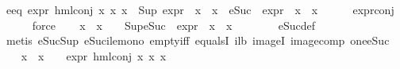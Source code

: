 \begin{isabellebody}
\ e{}{\isacharunderscore}{\kern0pt}eq{\isacharcolon}{\kern0pt}\ {\isachardoublequoteopen}expr{\isacharunderscore}{\kern0pt}{}\ {\isacharparenleft}{\kern0pt}hml{\isacharunderscore}{\kern0pt}conj\ x{}\ x{}\ x{}{\isacharparenright}{\kern0pt}\ {\isacharequal}{\kern0pt}\ {\isacharparenleft}{\kern0pt}Sup\ {\isacharparenleft}{\kern0pt}{\isacharparenleft}{\kern0pt}expr{\isacharunderscore}{\kern0pt}{}\ {\isasymcirc}\ x{}{\isacharparenright}{\kern0pt}\ {\isacharbackquote}{\kern0pt}\ x{}\ {\isasymunion}\ {\isacharparenleft}{\kern0pt}{\isacharparenleft}{\kern0pt}eSuc\ {\isasymcirc}\ expr{\isacharunderscore}{\kern0pt}{}\ {\isasymcirc}\ x{}{\isacharparenright}{\kern0pt}\ {\isacharbackquote}{\kern0pt}\ x{}{\isacharparenright}{\kern0pt}{\isacharparenright}{\kern0pt}{\isacharparenright}{\kern0pt}{\isachardoublequoteclose}\isanewline
\ \ \ \ \isamarkupfalse%
\ expr{\isacharunderscore}{\kern0pt}{}{\isacharunderscore}{\kern0pt}conj\isanewline
\ \ \ \ \isamarkupfalse%
\ force\isanewline
\ \ \isamarkupfalse%
\ {\isachardoublequoteopen}{\isacharparenleft}{\kern0pt}x{}\ {\isacharbackquote}{\kern0pt}\ x{}\ {\isasymnoteq}\ {\isacharbraceleft}{\kern0pt}{\isacharbraceright}{\kern0pt}{\isacharparenright}{\kern0pt}\ {\isasymlongrightarrow}\ Sup{\isacharparenleft}{\kern0pt}{\isacharparenleft}{\kern0pt}{\isacharparenleft}{\kern0pt}eSuc\ {\isasymcirc}\ expr{\isacharunderscore}{\kern0pt}{}\ {\isasymcirc}\ x{}{\isacharparenright}{\kern0pt}\ {\isacharbackquote}{\kern0pt}\ x{}{\isacharparenright}{\kern0pt}{\isacharparenright}{\kern0pt}\ {\isasymge}\ {}{\isachardoublequoteclose}\isanewline
\ \ \ \ \isamarkupfalse%
\ eSuc{\isacharunderscore}{\kern0pt}def\ \isanewline
\ \ \ \ \isamarkupfalse%
\ {\isacharparenleft}{\kern0pt}metis\ eSuc{\isacharunderscore}{\kern0pt}Sup\ eSuc{\isacharunderscore}{\kern0pt}ile{\isacharunderscore}{\kern0pt}mono\ empty{\isacharunderscore}{\kern0pt}iff\ equals{}I\ i{}{\isacharunderscore}{\kern0pt}lb\ imageI\ image{\isacharunderscore}{\kern0pt}comp\ one{\isacharunderscore}{\kern0pt}eSuc{\isacharparenright}{\kern0pt}\isanewline
\ \ \isamarkupfalse%
\ {\isachardoublequoteopen}{\isacharparenleft}{\kern0pt}x{}\ {\isacharbackquote}{\kern0pt}\ x{}\ {\isasymnoteq}\ {\isacharbraceleft}{\kern0pt}{\isacharbraceright}{\kern0pt}{\isacharparenright}{\kern0pt}\ {\isasymlongrightarrow}\ {\isacharparenleft}{\kern0pt}expr{\isacharunderscore}{\kern0pt}{}\ {\isacharparenleft}{\kern0pt}hml{\isacharunderscore}{\kern0pt}conj\ x{}\ x{}\ x{}{\isacharparenright}{\kern0pt}\ {\isasymge}\ {}{\isacharparenright}{\kern0pt}{\isachardoublequoteclose}\isanewline

\end{isabellebody}
